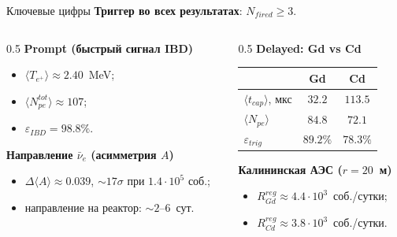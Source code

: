 \documentclass[aspectratio=169,12pt]{beamer}
\begin{document}
\begin{frame}{Ключевые цифры}
\small
\textbf{Триггер во всех результатах}: $N_{fired}\ge 3$.
\smallskip

\begin{columns}[T]
\begin{column}{0.5\textwidth}
\textbf{Prompt (быстрый сигнал IBD)}
\begin{itemize}\setlength{\itemsep}{2pt}
    \item $\langle T_{e^+}\rangle \approx 2{.}40$~MeV;
    \item $\langle N^{tot}_{pe}\rangle \approx 107$;
    \item $\varepsilon_{IBD} = 98{.}8\%$.
\end{itemize}
\medskip

\textbf{Направление $\bar{\nu}_e$ (асимметрия $A$)}
\begin{itemize}\setlength{\itemsep}{2pt}
    \item $\Delta\langle A\rangle \approx 0{.}039$, $\sim 17\sigma$ при $1{.}4\cdot 10^5$ соб.;
    \item направление на реактор: $\sim 2$--$6$~сут.
\end{itemize}
\end{column}
\begin{column}{0.5\textwidth}
\textbf{Delayed: Gd vs Cd}
\begin{center}
\small
\begin{tabular}{lcc}
\toprule
 & \textbf{Gd} & \textbf{Cd} \\
\midrule
$\langle t_{cap}\rangle$, мкс & $32.2$ & $113.5$ \\
$\langle N_{pe}\rangle$       & $84.8$ & $72.1$ \\
$\varepsilon_{trig}$          & $89.2\%$ & $78.3\%$ \\
\bottomrule
\end{tabular}
\end{center}
\medskip

\textbf{Калининская АЭС ($r=20$~м)}
\begin{itemize}\setlength{\itemsep}{2pt}
    \item $R^{reg}_{Gd}\approx 4{.}4\cdot 10^{3}$~соб./сутки;
    \item $R^{reg}_{Cd}\approx 3{.}8\cdot 10^{3}$~соб./сутки.
\end{itemize}
\end{column}
\end{columns}
\end{frame}
\end{document}

